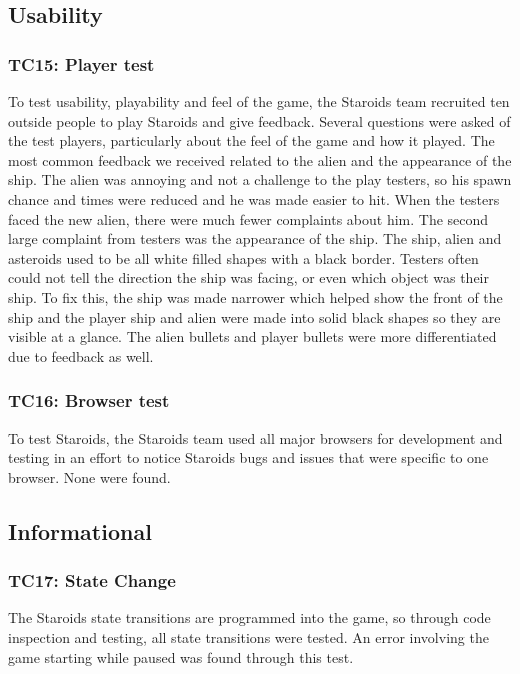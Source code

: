 \documentclass[12pt, titlepage]{article}
\begin{document}
\subsection{Usability}

\subsubsection{TC15: Player test}
To test usability, playability and feel of the game, the Staroids team recruited ten outside people to play Staroids and give feedback. Several questions were asked of the test players, particularly about the feel of the game and how it played. The most common feedback we received related to the alien and the appearance of the ship. The alien was annoying and not a challenge to the play testers, so his spawn chance and times were reduced and he was made easier to hit. When the testers faced the new alien, there were much fewer complaints about him. The second large complaint from testers was the appearance of the ship. The ship, alien and asteroids used to be all white filled shapes with a black border. Testers often could not tell the direction the ship was facing, or even which object was their ship. To fix this, the ship was made narrower which helped show the front of the ship and the player ship and alien were made into solid black shapes so they are visible at a glance. The alien bullets and player bullets were more differentiated due to feedback as well.\\

\subsubsection{TC16: Browser test}
To test Staroids, the Staroids team used all major browsers for development and testing in an effort to notice Staroids bugs and issues that were specific to one browser. None were found.\\

\subsection{Informational}

\subsubsection{TC17: State Change}
The Staroids state transitions are programmed into the game, so through code inspection and testing, all state transitions were tested. An error involving the game starting while paused was found through this test.
\end{document}
